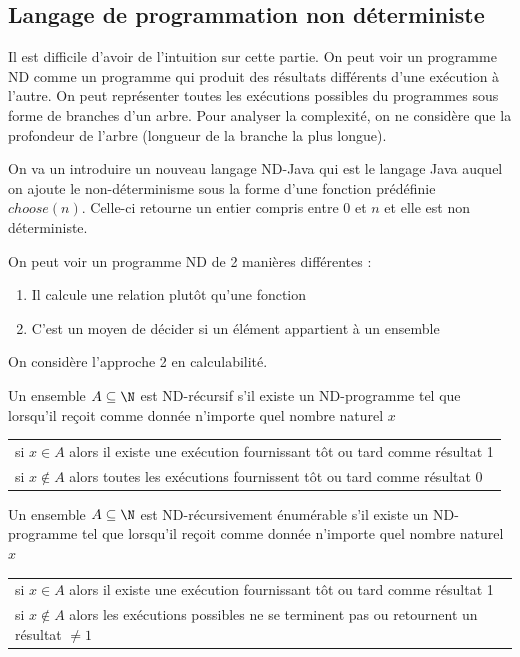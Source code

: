 
\subsection{Langage de programmation non déterministe}
\label{ssub:langague_de_programmation_non_d_terministe}

\begin{myrem}
	Il est difficile d'avoir de l'intuition sur cette partie. On peut
	voir un programme ND comme un programme qui produit des résultats
	différents d'une exécution à l'autre. On peut représenter toutes
	les exécutions possibles du programmes sous forme de branches d'un
	arbre. Pour analyser la complexité, on ne
	considère que la profondeur de l'arbre (longueur de la branche
	la plus longue).
\end{myrem}

On va un introduire un nouveau langage ND-Java qui est le langage Java
auquel on ajoute le non-déterminisme sous la forme d'une fonction
prédéfinie $choose(n)$. Celle-ci retourne un entier compris entre $0$ et $n$ et elle
est non déterministe.

On peut voir un programme ND de 2 manières différentes :
\begin{enumerate}
	\item Il calcule une relation plutôt qu'une fonction
	\item C'est un moyen de décider si un élément appartient à un
		ensemble
\end{enumerate}
On considère l'approche 2 en calculabilité.

\begin{mydef}[ND-récursif] \label{def:ND-rec}
	Un ensemble $A \subseteq \N$ est ND-récursif s’il existe un
	ND-programme tel que lorsqu'il reçoit comme donnée n'importe quel nombre
	naturel $x$ \\
	\begin{tabular}{l}
	si $x \in A$ alors il existe une exécution fournissant tôt ou tard
	comme résultat 1 \\
	si $x \notin A$ alors toutes les exécutions fournissent tôt ou tard
	comme résultat 0 \\
	\end{tabular}
\end{mydef}

\begin{mydef} \label{def:ND-recenum}
	Un ensemble $A \subseteq \N$ est ND-récursivement énumérable s’il existe un
	ND-programme tel que lorsqu'il reçoit comme donnée n'importe quel nombre
	naturel $x$ \\
	\begin{tabular}{l}
	si $x \in A$ alors il existe une exécution fournissant tôt ou tard
	comme résultat 1 \\
	si $x \notin A$ alors les exécutions possibles ne se terminent pas ou
	retournent un résultat $\neq 1$ \\
	\end{tabular}
\end{mydef}

